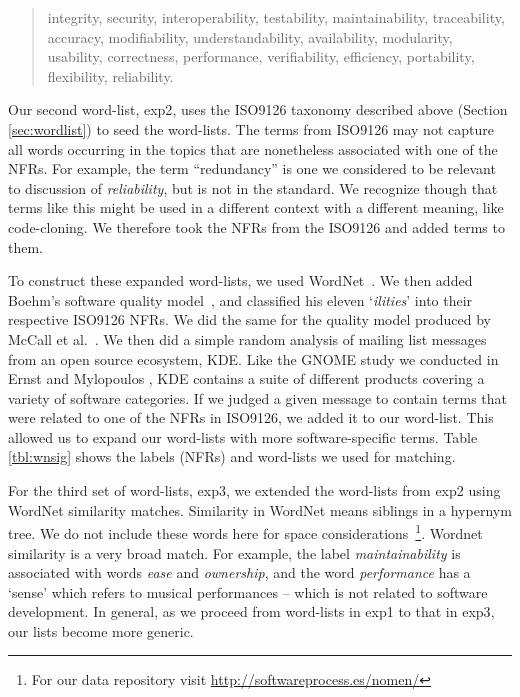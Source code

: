 \documentclass[smallextended]{svjour3}       %
\begin{document}
\begin{quotation}
\small \noindent \textsf{
integrity, security,
interoperability, testability, maintainability, traceability,
accuracy, modifiability, understandability, availability, modularity,
usability, correctness, performance, verifiability, efficiency,
portability, flexibility, reliability.
}
\end{quotation}

Our second word-list, \textsf{exp2}, uses the ISO9126 taxonomy described above (Section \ref{sec:wordlist}) to seed the word-lists.
The terms from ISO9126 may not capture all words occurring in the topics that are nonetheless associated with one of the NFRs. 
For example, the term ``redundancy'' is one 
we considered to be
relevant to discussion of \emph{reliability}, but is not in the
standard. We recognize though that terms like this might be used in a
different context with a different meaning, like code-cloning.
We therefore took the NFRs from the ISO9126 and added terms to them.

To construct these expanded word-lists, we used
WordNet~\cite{Fellbaum1998}.
We then added Boehm's software quality model~\cite{Boehm+:1976:ICSE}, and classified his eleven `\emph{ilities}' into their respective ISO9126 NFRs. 
We did the same for the quality model produced by McCall et al.~\cite{mccall1977}. 
We then did a simple random analysis of mailing list messages from an open source ecosystem, KDE. Like the GNOME study we conducted in Ernst and Mylopoulos \cite{ernst10refsq}, KDE contains a suite of different products covering a variety of software categories. If we judged a given message to contain terms that were
related to one of the NFRs in ISO9126, we added it to our word-list. This allowed us to expand our word-lists with more software-specific terms.
Table \ref{tbl:wnsig} shows the labels (NFRs) and word-lists we used for matching.

For the third set of word-lists, \textsf{exp3}, we extended the word-lists from \textsf{exp2} using WordNet similarity matches. 
Similarity in WordNet means siblings in a hypernym tree. 
We do not include these words here for space
considerations~\footnote{For our data repository visit \url{http://softwareprocess.es/nomen/}}. 
Wordnet similarity is a very broad match. For example, the label \emph{maintainability} is associated with
words \emph{ease} and \emph{ownership}, and the word \emph{performance} has a `sense' which refers to musical performances -- which is not related to software development. In general, as we proceed from word-lists in \textsf{exp1} to that in \textsf{exp3}, our lists become more generic.
\end{document}
